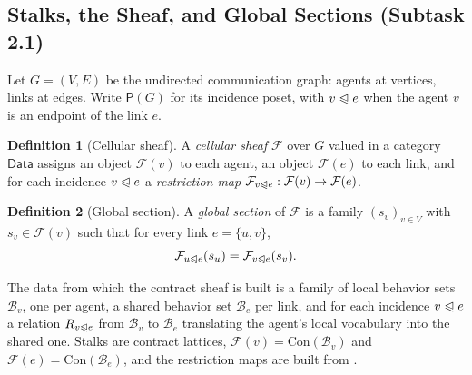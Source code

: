\documentclass[11pt]{article}
\newif\ifshowcomments
\newcommand{\cat}[1]{\mathsf{#1}}
\newcommand{\contract}[1]{\mathrm{Con}(#1)}
\newcommand{\face}{\trianglelefteqslant}
\theoremstyle{definition}
\newtheorem{definition}{Definition}
\theoremstyle{remark}
\newcommand{\prompt}[1]{%
    \ifshowcomments
        ~\todo[inline, color=techgold!80, textcolor=black,caption={Task}]{{\bf Prompt:} #1}%
    \fi
}
\begin{document}
\subsection{Stalks, the Sheaf, and Global Sections (Subtask 2.1)}
\label{sec:sheaves}

\prompt{Assign $\overline{\mathbb{R}}$- and $\mathbb{B}$-enriched categories to vertices and
edges, representing task spaces (e.g., convex programs) and discourse spaces (e.g.,
communication constraints). Deliverable: Sheaf stalk definitions, part of Milestone 2's figure
and report.}

Let $G = (V, E)$ be the undirected communication graph: agents at vertices, links at edges.
Write $\mathsf{P}(G)$ for its incidence poset, with $v \face e$ when the agent $v$ is an
endpoint of the link $e$.

\begin{definition}[Cellular sheaf]
A \emph{cellular sheaf} $\mathcal{F}$ over $G$ valued in a category $\cat{Data}$ assigns an
object $\mathcal{F}(v)$ to each agent, an object $\mathcal{F}(e)$ to each link, and for each
incidence $v \face e$ a \emph{restriction map}
$\mathcal{F}_{v \face e} : \mathcal{F}(v) \to \mathcal{F}(e)$.
\end{definition}

\begin{definition}[Global section]
\label{def:global-section}
A \emph{global section} of $\mathcal{F}$ is a family $(s_v)_{v \in V}$ with
$s_v \in \mathcal{F}(v)$ such that for every link $e = \{u,v\}$,
\begin{equation}
\label{eq:section}
\mathcal{F}_{u \face e}(s_u) = \mathcal{F}_{v \face e}(s_v).
\end{equation}
\end{definition}

The data from which the contract sheaf is built is a family of local behavior sets
$\mathcal{B}_v$, one per agent, a shared behavior set $\mathcal{B}_e$ per link, and for each
incidence $v \face e$ a relation $R_{v \face e}$ from $\mathcal{B}_v$ to $\mathcal{B}_e$
translating the agent's local vocabulary into the shared one.
Stalks are contract lattices, $\mathcal{F}(v) = \contract{\mathcal{B}_v}$ and
$\mathcal{F}(e) = \contract{\mathcal{B}_e}$, and the restriction maps are built from
.
\end{document}

